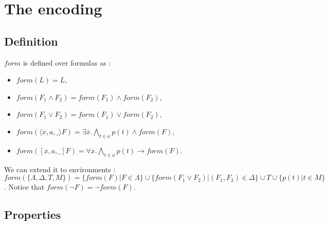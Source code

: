 \documentclass[a4paper,10pt]{report}
\newcommand{\F}{\mathit{form}}
\begin{document}
\section{The encoding}
\subsection{Definition}
\noindent
$\F$ is defined over formulas as :
\begin{itemize}
 \item $\F(L)=L$,
 \item $\F(F_1\wedge F_2)=\F(F_1)\wedge\F(F_2)$,
 \item $\F(F_1\vee F_2)=\F(F_1)\vee\F(F_2)$,
 \item $\F(\langle\overline x,a,\_\rangle F)=\exists\overline x.\bigwedge_{t\in a} p(t)\wedge\F(F)$,
 \item $\F([\overline x,a,\_]F)=\forall \overline x.\bigwedge_{t\in a} p(t)\rightarrow\F(F)$.
\end{itemize}
We can extend it to environments :\\
$\F(\{\Lambda,\Delta,T,M\})=\{\F(F)|F\in\Lambda\}
 \cup\{\F(F_1\vee F_2)|(F_1,F_2)\in\Delta\}\cup T\cup\{p(t)|t\in M\}$.
Notice that $\F(\neg F)=\neg\F(F)$.
\subsection{Properties}
\end{document}
